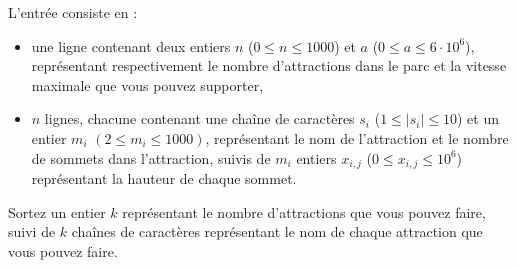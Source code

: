 \begin{Input}
    L'entrée consiste en :
    \begin{itemize}
        \item une ligne contenant deux entiers $n$ ($0 \leq n \leq 1000$) et $a$ ($0 \leq a \leq 6 \cdot 10^6$), représentant respectivement le nombre d'attractions dans le parc et la vitesse maximale que vous pouvez supporter,
        \item $n$ lignes, chacune contenant une chaîne de caractères $s_i$ ($1 \leq |s_i| \leq 10$) et un entier $m_i$ $(2 \leq m_i \leq 1000)$, représentant le nom de l'attraction et le nombre de sommets dans l'attraction, suivis de $m_i$ entiers $x_{i,j}$ ($0 \leq x_{i,j} \leq 10^6$) représentant la hauteur de chaque sommet.
    \end{itemize}
\end{Input}

\begin{Output}
    Sortez un entier $k$ représentant le nombre d'attractions que vous pouvez faire, suivi de $k$ chaînes de caractères représentant le nom de chaque attraction que vous pouvez faire.
\end{Output}
